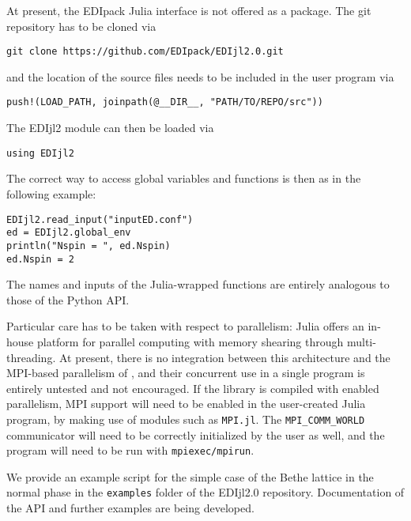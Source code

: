 \documentclass[edipack2.tex]{subfiles}
\begin{document}
At present, the EDIpack Julia interface is not offered as a package. The git repository has to be cloned via

\begin{lstlisting}[style=mybash]
git clone https://github.com/EDIpack/EDIjl2.0.git
\end{lstlisting}

and the location of the source files needs to be included in the user program via

\begin{lstlisting}[style=mybash]
push!(LOAD_PATH, joinpath(@__DIR__, "PATH/TO/REPO/src"))
\end{lstlisting}

The EDIjl2 module can then be loaded via

\begin{lstlisting}[style=mybash]
using EDIjl2
\end{lstlisting}

The correct way to access global variables and functions is then as in the following example:

\begin{lstlisting}[style=mybash]
EDIjl2.read_input("inputED.conf")
ed = EDIjl2.global_env
println("Nspin = ", ed.Nspin)
ed.Nspin = 2
\end{lstlisting}

The names and inputs of the Julia-wrapped functions are entirely analogous to those of the Python API.

Particular care has to be taken with respect to parallelism: Julia offers an in-house platform for parallel computing with memory shearing through multi-threading. At present, there is no integration between this architecture and the MPI-based parallelism of \NAME{}, and their concurrent use in a single program is entirely untested and not encouraged. If the library is compiled with enabled parallelism, MPI support will need to be enabled in the user-created Julia program, by making use of modules such as {\tt  MPI.jl}. The {\tt MPI\_COMM\_WORLD} communicator will need to be correctly initialized by the user as well, and the program will need to be run with {\tt  mpiexec/mpirun}.

We provide an example script for the simple case of the Bethe lattice in the normal phase in the {\tt  examples} folder of the EDIjl2.0 repository. Documentation of the API and further examples are being developed.
\end{document}
